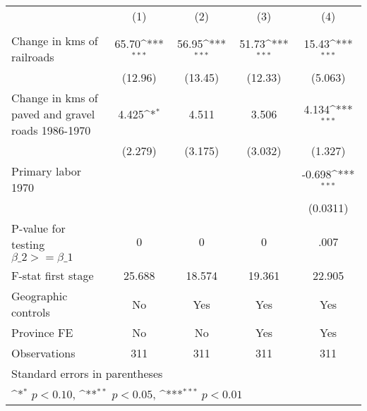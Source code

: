 {
\def\sym#1{\ifmmode^{#1}\else\(^{#1}\)\fi}
\begin{tabular}{l*{4}{c}}
\hline\hline
                &\multicolumn{1}{c}{(1)}&\multicolumn{1}{c}{(2)}&\multicolumn{1}{c}{(3)}&\multicolumn{1}{c}{(4)}\\
                &\multicolumn{1}{c}{}&\multicolumn{1}{c}{}&\multicolumn{1}{c}{}&\multicolumn{1}{c}{}\\
\hline
Change in kms of railroads&    65.70\sym{***}&    56.95\sym{***}&    51.73\sym{***}&    15.43\sym{***}\\
                &  (12.96)         &  (13.45)         &  (12.33)         &  (5.063)         \\
[1em]
Change in kms of paved and gravel roads 1986-1970&    4.425\sym{*}  &    4.511         &    3.506         &    4.134\sym{***}\\
                &  (2.279)         &  (3.175)         &  (3.032)         &  (1.327)         \\
[1em]
Primary labor 1970&                  &                  &                  &   -0.698\sym{***}\\
                &                  &                  &                  & (0.0311)         \\
\hline
P-value for testing $\beta\_{2} >= \beta\_{1}$&        0         &        0         &        0         &     .007         \\
F-stat first stage&   25.688         &   18.574         &   19.361         &   22.905         \\
Geographic controls&       No         &      Yes         &      Yes         &      Yes         \\
Province FE     &       No         &       No         &      Yes         &      Yes         \\
Observations    &      311         &      311         &      311         &      311         \\
\hline\hline
\multicolumn{5}{l}{\footnotesize Standard errors in parentheses}\\
\multicolumn{5}{l}{\footnotesize \sym{*} \(p<0.10\), \sym{**} \(p<0.05\), \sym{***} \(p<0.01\)}\\
\end{tabular}
}
